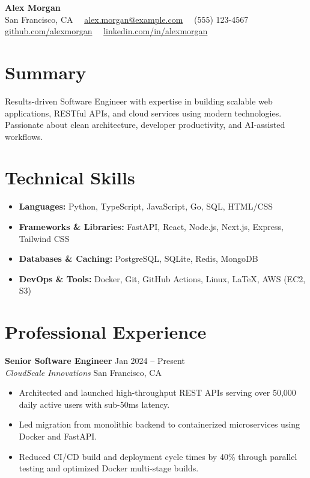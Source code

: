 \documentclass[11pt,a4paper]{article}
\begin{document}
\begin{center}
    {\LARGE \textbf{Alex Morgan}} \\ \vspace{4pt}
    San Francisco, CA \ \textbullet\ \href{mailto:alex.morgan@example.com}{alex.morgan@example.com} \ \textbullet\ (555) 123-4567 \\
    \href{https://github.com/alexmorgan}{github.com/alexmorgan} \ \textbullet\ \href{https://linkedin.com/in/alexmorgan}{linkedin.com/in/alexmorgan}
\end{center}

\section*{Summary}
Results-driven Software Engineer with expertise in building scalable web applications, RESTful APIs, and cloud services using modern technologies. Passionate about clean architecture, developer productivity, and AI-assisted workflows.

\section*{Technical Skills}
\begin{itemize}
    \item \textbf{Languages:} Python, TypeScript, JavaScript, Go, SQL, HTML/CSS
    \item \textbf{Frameworks \& Libraries:} FastAPI, React, Node.js, Next.js, Express, Tailwind CSS
    \item \textbf{Databases \& Caching:} PostgreSQL, SQLite, Redis, MongoDB
    \item \textbf{DevOps \& Tools:} Docker, Git, GitHub Actions, Linux, LaTeX, AWS (EC2, S3)
\end{itemize}

\section*{Professional Experience}
\textbf{Senior Software Engineer} \hfill Jan 2024 -- Present \\
\textit{CloudScale Innovations} \hfill San Francisco, CA
\begin{itemize}
    \item Architected and launched high-throughput REST APIs serving over 50,000 daily active users with sub-50ms latency.
    \item Led migration from monolithic backend to containerized microservices using Docker and FastAPI.
    \item Reduced CI/CD build and deployment cycle times by 40\% through parallel testing and optimized Docker multi-stage builds.
\end{itemize}
\end{document}

